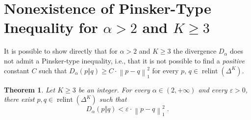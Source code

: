 \documentclass[11pt,oneside,a4paper]{article}
\newcommand{\e}{\varepsilon}
\newcommand{\lrb}[1]{\left(#1\right)}
\newcommand{\lno}[1]{\left\lVert#1\right\rVert}
\theoremstyle{plain}
\newtheorem{theorem}{Theorem}
\theoremstyle{definition}
\theoremstyle{remark}
\newcommand{\simplex}[1]{\Delta^{#1}}
\DeclareMathOperator*{\relint}{relint}
\begin{document}
\section{Nonexistence of Pinsker-Type Inequality for \texorpdfstring{$\alpha >2$ and $K \geq 3$} {alpha > 2 and K >= 3} }\label{app:nopinsker}
It is possible to show directly that for $\alpha >2$ and  $K \geq 3$ the divergence $D_\alpha$ does not admit a Pinsker-type inequality, i.e., that it is not possible to find a \emph{positive} constant $C$ such that $D_\alpha(p\Vert q) \ge C\cdot 
    \lno{ p-q }_1^2$ for every $p$, $q \in \relint{\lrb{\simplex{K}}}$.
\begin{theorem}
\label{t:K_big_alpha_big}
Let $K \geq 3$ be an integer. For every $\alpha \in (2, +\infty)$ and every $\e >0$, there exist $p,q \in \relint\lrb{\simplex{K}}$ such that
\[
    D_\alpha(p\Vert q)
<
    \e \cdot \lno{ p-q }_1^2\;.
\]
\end{theorem}
\end{document}
